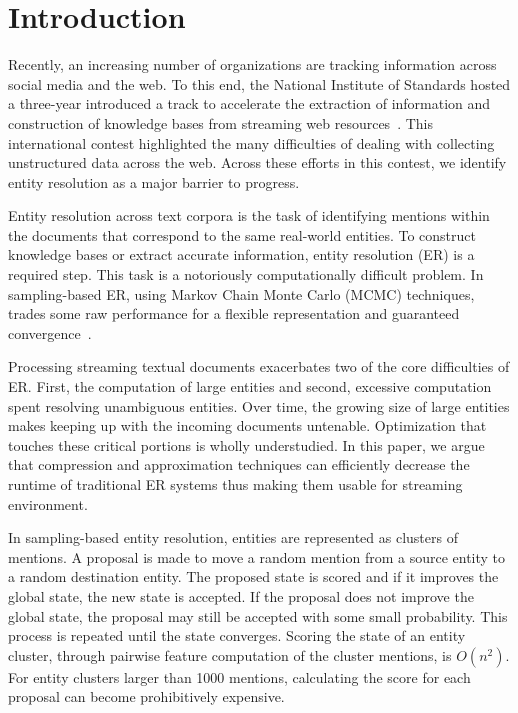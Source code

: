 
\section{Introduction}

Recently, an increasing number of organizations are tracking information across
social media and the web.
To this end, the National Institute of Standards hosted a three-year
introduced a track to accelerate the extraction of information and construction of knowledge bases from streaming web
resources~\cite{frank2013evaluating}.
This international contest highlighted the many difficulties of dealing with collecting 
unstructured data across the web.
Across these efforts in this contest, we identify entity resolution as a major barrier to progress. 


Entity resolution across text corpora is the task of identifying mentions 
within the documents that correspond to the same real-world entities.
To construct knowledge bases or extract accurate information, entity resolution (ER) is a required step.
This task is a notoriously computationally difficult problem.
In sampling-based ER, using Markov Chain Monte Carlo (MCMC) techniques, trades some raw performance for a flexible representation 
and guaranteed convergence~\cite{mccallum03towardconditional,singh2011large,wick2013discriminative}.

Processing streaming textual documents exacerbates two of the core difficulties of ER.\@
First, the computation of large entities and second, excessive
computation spent resolving unambiguous entities.
Over time, the growing size of large entities makes keeping up with the incoming documents untenable.
Optimization that touches these critical portions is wholly understudied.
In this paper, we argue that compression and approximation 
techniques can efficiently decrease the runtime of traditional ER systems thus
making them usable for streaming environment.

In sampling-based entity resolution, entities are represented as clusters of mentions.
A proposal is made to move a random mention from a source entity to a random destination entity.
The proposed state is scored and if it improves the global state, the new state is accepted.
If the proposal does not improve the global state, the proposal may still be accepted with some small probability.
This process is repeated until the state converges.
Scoring the state of an entity cluster, through pairwise feature computation of the cluster mentions, is $O(n^2)$.
For entity clusters larger than 1000 mentions, calculating the score for each proposal can become prohibitively expensive.

